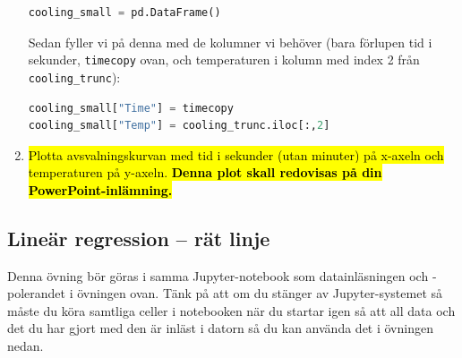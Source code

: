 \documentclass{article}
\begin{document}
\begin{enumerate}
    \begin{lstlisting}[language=Python]
cooling_small = pd.DataFrame()
\end{lstlisting}
    Sedan fyller vi på denna med de kolumner vi behöver (bara förlupen tid i sekunder, \texttt{timecopy} ovan, och temperaturen i kolumn med index 2 från \texttt{cooling\_trunc}):
    \begin{lstlisting}[language=Python]
cooling_small["Time"] = timecopy
cooling_small["Temp"] = cooling_trunc.iloc[:,2]
\end{lstlisting}
    \item \hl{Plotta avsvalningskurvan med tid i sekunder (utan minuter) på x-axeln och temperaturen på y-axeln. \textbf{Denna plot skall redovisas på din PowerPoint-inlämning.}}
\end{enumerate}

\subsection{Lineär regression -- rät linje}
Denna övning bör göras i samma Jupyter-notebook som datainläsningen och -polerandet i övningen ovan. Tänk på att om du stänger av Jupyter-systemet så måste du köra samtliga celler i notebooken när du startar igen så att all data och det du har gjort med den är inläst i datorn så du kan använda det i övningen nedan.
\end{document}
